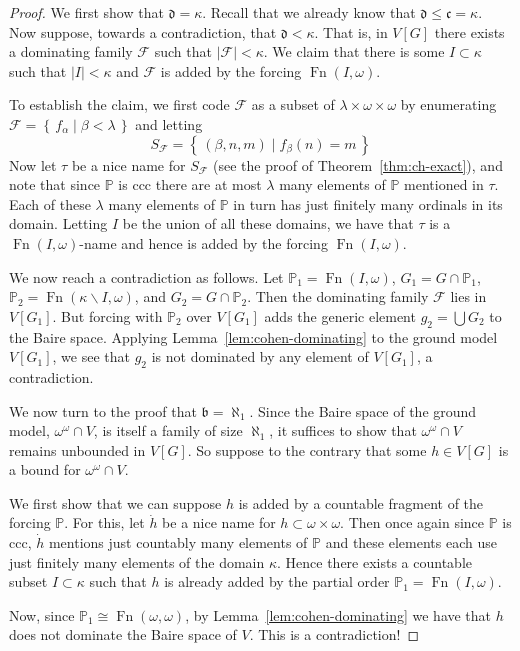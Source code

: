 \documentclass[11pt,oneside]{amsbook}
\newcommand{\set}[1]{\left\{\,#1\,\right\}}
\newcommand{\PP}{\mathbb P}
\DeclareMathOperator{\Fn}{Fn}
\theoremstyle{definition}
\theoremstyle{plain}
\theoremstyle{definition}
\theoremstyle{remark}
\begin{document}
\begin{proof}
  We first show that $\mathfrak d=\kappa$. Recall that we already know that $\mathfrak d\leq\mathfrak c=\kappa$. Now suppose, towards a contradiction, that $\mathfrak d<\kappa$. That is, in $V[G]$ there exists a dominating family $\mathcal F$ such that $|\mathcal F|<\kappa$. We claim that there is some $I\subset\kappa$ such that $|I|<\kappa$ and $\mathcal F$ is added by the forcing $\Fn(I,\omega)$.

  To establish the claim, we first code $\mathcal F$ as a subset of $\lambda\times\omega\times\omega$ by enumerating $\mathcal F=\set{f_\alpha\mid\beta<\lambda}$ and letting
  \[S_{\mathcal F}=\set{(\beta,n,m)\mid f_\beta(n)=m}
  \]
  Now let $\tau$ be a nice name for $S_{\mathcal F}$ (see the proof of Theorem~\ref{thm:ch-exact}), and note that since $\PP$ is ccc there are at most $\lambda$ many elements of $\PP$ mentioned in $\tau$. Each of these $\lambda$ many elements of $\PP$ in turn has just finitely many ordinals in its domain. Letting $I$ be the union of all these domains, we have that $\tau$ is a $\Fn(I,\omega)$-name and hence is added by the forcing $\Fn(I,\omega)$.

  We now reach a contradiction as follows. Let $\PP_1=\Fn(I,\omega)$, $G_1=G\cap\PP_1$, $\PP_2=\Fn(\kappa\smallsetminus I,\omega)$, and $G_2=G\cap\PP_2$. Then the dominating family $\mathcal F$ lies in $V[G_1]$. But forcing with $\PP_2$ over $V[G_1]$ adds the generic element $g_2=\bigcup G_2$ to the Baire space. Applying Lemma~\ref{lem:cohen-dominating} to the ground model $V[G_1]$, we see that $g_2$ is not dominated by any element of $V[G_1]$, a contradiction.

  We now turn to the proof that $\mathfrak b=\aleph_1$. Since the Baire space of the ground model, $\omega^\omega\cap V$, is itself a family of size $\aleph_1$, it suffices to show that $\omega^\omega\cap V$ remains unbounded in $V[G]$. So suppose to the contrary that some $h\in V[G]$ is a bound for $\omega^\omega\cap V$.

  We first show that we can suppose $h$ is added by a countable fragment of the forcing $\PP$. For this, let $\dot h$ be a nice name for $h\subset\omega\times\omega$. Then once again since $\PP$ is ccc, $\dot h$ mentions just countably many elements of $\PP$ and these elements each use just finitely many elements of the domain $\kappa$. Hence there exists a countable subset $I\subset\kappa$ such that $h$ is already added by the partial order $\PP_1=\Fn(I,\omega)$.

  Now, since $\PP_1\cong\Fn(\omega,\omega)$, by Lemma~\ref{lem:cohen-dominating} we have that $h$ does not dominate the Baire space of $V$. This is a contradiction!
\end{proof}
\end{document}
